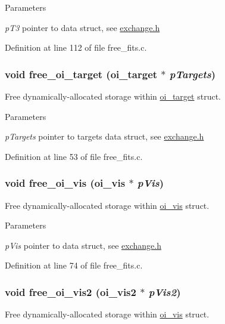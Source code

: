 \begin{DoxyParams}{Parameters}
\item[{\em pT3}]pointer to data struct, see \hyperlink{exchange_8h}{exchange.h} \end{DoxyParams}


Definition at line 112 of file free\_\-fits.c.

\hypertarget{group__oitable_gadc9eebf0079ab77f472f2577da42c591}{
\subsubsection[{free\_\-oi\_\-target}]{\setlength{\rightskip}{0pt plus 5cm}void free\_\-oi\_\-target ({\bf oi\_\-target} $\ast$ {\em pTargets})}}
\label{group__oitable_gadc9eebf0079ab77f472f2577da42c591}
Free dynamically-\/allocated storage within \hyperlink{structoi__target}{oi\_\-target} struct.


\begin{DoxyParams}{Parameters}
\item[{\em pTargets}]pointer to targets data struct, see \hyperlink{exchange_8h}{exchange.h} \end{DoxyParams}


Definition at line 53 of file free\_\-fits.c.

\hypertarget{group__oitable_ga244851af58b93c4445a3eeddb9f794b7}{
\subsubsection[{free\_\-oi\_\-vis}]{\setlength{\rightskip}{0pt plus 5cm}void free\_\-oi\_\-vis ({\bf oi\_\-vis} $\ast$ {\em pVis})}}
\label{group__oitable_ga244851af58b93c4445a3eeddb9f794b7}
Free dynamically-\/allocated storage within \hyperlink{structoi__vis}{oi\_\-vis} struct.


\begin{DoxyParams}{Parameters}
\item[{\em pVis}]pointer to data struct, see \hyperlink{exchange_8h}{exchange.h} \end{DoxyParams}


Definition at line 74 of file free\_\-fits.c.

\hypertarget{group__oitable_ga109b89eb6ed055562f7c207de9d316a3}{
\subsubsection[{free\_\-oi\_\-vis2}]{\setlength{\rightskip}{0pt plus 5cm}void free\_\-oi\_\-vis2 ({\bf oi\_\-vis2} $\ast$ {\em pVis2})}}
\label{group__oitable_ga109b89eb6ed055562f7c207de9d316a3}
Free dynamically-\/allocated storage within \hyperlink{structoi__vis}{oi\_\-vis} struct.


